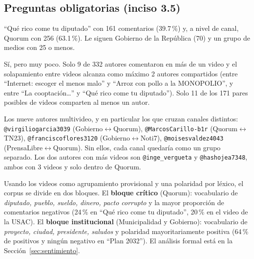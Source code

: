 \documentclass[11pt,a4paper]{article}
\begin{document}
\subsection{Preguntas obligatorias (inciso 3.5)}
\begin{description}[leftmargin=0em,style=unboxed,itemsep=3pt]
\item[\textnormal{\itshape \textquestiondown{}Qu\'e videos y canales concentran la mayor participaci\'on?}]
``Qu\'e rico come tu diputado'' con 161 comentarios (39.7\,\%) y, a nivel de canal, Quorum con 256
(63.1\,\%). Le siguen Gobierno de la Rep\'ublica (70) y un grupo de medios con 25 o menos.

\item[\textnormal{\itshape \textquestiondown{}Existen audiencias compartidas?}]
S\'i, pero muy poco. Solo 9 de 332 autores comentaron en m\'as de un video y el solapamiento entre
videos alcanza como m\'aximo 2 autores compartidos (entre ``Internet: escoger el menos malo'' y
``Arroz con pollo a la MONOPOLIO'', y entre ``La cooptaci\'on\dots'' y ``Qu\'e rico come tu
diputado''). Solo 11 de los 171 pares posibles de videos comparten al menos un autor.

\item[\textnormal{\itshape \textquestiondown{}Qu\'e autores funcionan como puentes?}]
Los nueve autores multivideo, y en particular los que cruzan canales distintos: \texttt{@virgiliogarcia3039}
(Gobierno$\leftrightarrow$Quorum), \texttt{@MarcosCarillo-b1r} (Quorum$\leftrightarrow$TN23),
\texttt{@franciscoflores3120} (Gobierno$\leftrightarrow$Noti7), \texttt{@moisesvaldez4043}
(PrensaLibre$\leftrightarrow$Quorum). Sin ellos, cada canal quedar\'ia como un grupo separado. Los dos
autores con m\'as videos son \texttt{@inge\_vergueta} y \texttt{@hashojea7348}, ambos con 3 videos y
solo dentro de Quorum.

\item[\textnormal{\itshape \textquestiondown{}Qu\'e temas y sentimientos caracterizan a los grupos?}]
Usando los videos como agrupamiento provisional y una polaridad por l\'exico, el corpus se divide en
dos bloques. El \textbf{bloque cr\'itico} (Quorum): vocabulario de \emph{diputado, pueblo, sueldo,
dinero, pacto corrupto} y la mayor proporci\'on de comentarios negativos (24\,\% en ``Qu\'e rico come
tu diputado'', 20\,\% en el video de la USAC). El \textbf{bloque institucional} (Municipalidad y
Gobierno): vocabulario de \emph{proyecto, ciudad, presidente, saludos} y polaridad mayoritariamente
positiva (64\,\% de positivos y ning\'un negativo en ``Plan 2032''). El an\'alisis formal est\'a en la
Secci\'on~\ref{sec:sentimiento}.


\end{description}
\end{document}
